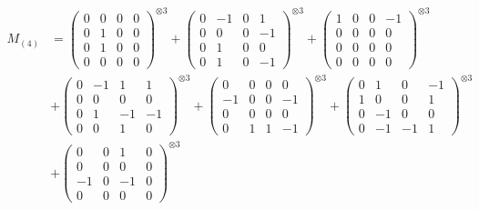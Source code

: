 \documentclass{article}
\newcommand{\Mthree}{%
    M_{(4)}
}
\begin{document}
        \newpage
        
        \footnotesize{
        \begin{align}
        \Mthree
        &= \label{Rs16-Rc11-Solution-1-c1} \begin{pmatrix} 0 & 0 & 0 & 0 \\ 0 & 1 & 0 & 0 \\ 0 & 1 & 0 & 0 \\ 0 & 0 & 0 & 0 \end{pmatrix}^{\otimes 3} 
            + \begin{pmatrix} 0 & -1 & 0 & 1 \\ 0 & 0 & 0 & -1 \\ 0 & 1 & 0 & 0 \\ 0 & 1 & 0 & -1 \end{pmatrix}^{\otimes 3} 
            + \begin{pmatrix} 1 & 0 & 0 & -1 \\ 0 & 0 & 0 & 0 \\ 0 & 0 & 0 & 0 \\ 0 & 0 & 0 & 0 \end{pmatrix}^{\otimes 3} \\
        &+ \label{Rs16-Rc11-Solution-1-c4} \begin{pmatrix} 0 & -1 & 1 & 1 \\ 0 & 0 & 0 & 0 \\ 0 & 1 & -1 & -1 \\ 0 & 0 & 1 & 0 \end{pmatrix}^{\otimes 3} 
            + \begin{pmatrix} 0 & 0 & 0 & 0 \\ -1 & 0 & 0 & -1 \\ 0 & 0 & 0 & 0 \\ 0 & 1 & 1 & -1 \end{pmatrix}^{\otimes 3} 
            + \begin{pmatrix} 0 & 1 & 0 & -1 \\ 1 & 0 & 0 & 1 \\ 0 & -1 & 0 & 0 \\ 0 & -1 & -1 & 1 \end{pmatrix}^{\otimes 3} \\
        &+ \label{Rs16-Rc11-Solution-1-c7} \begin{pmatrix} 0 & 0 & 1 & 0 \\ 0 & 0 & 0 & 0 \\ -1 & 0 & -1 & 0 \\ 0 & 0 & 0 & 0 \end{pmatrix}^{\otimes 3} 

\end{align}}
\end{document}
